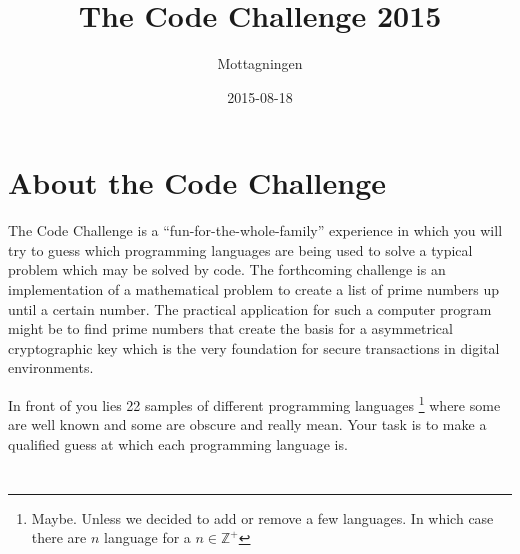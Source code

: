 \documentclass[a4paper]{report}
\title{The Code Challenge 2015}
\author{Mottagningen}
\date{2015-08-18}
\begin{document}
\maketitle
\setcounter{page}{2}

\chapter*{About the Code Challenge}
The Code Challenge is a ``fun-for-the-whole-family'' experience in which you
will try to guess which programming languages are being used to solve a
typical problem which may be solved by code. The forthcoming challenge is an
implementation of a mathematical problem to create a list of prime numbers
up until a certain number. The practical application for such a computer
program might be to find prime numbers that create the basis for a
asymmetrical cryptographic key which is the very foundation for secure
transactions in digital environments.

In front of you lies 22 samples of different programming languages
\footnote{Maybe. Unless we decided to add or remove a few languages.
    In which case there are $n$ language for a $n \in \mathbb{Z}^+$}
where some are well known and some are obscure and really mean.
Your task is to make a qualified guess at which each programming language is.

\newpage
{}
\setcounter{page}{0}
\chapter{}

\chapter{}

\chapter{}

\chapter{}

\chapter{}

\chapter{}

\end{document}
